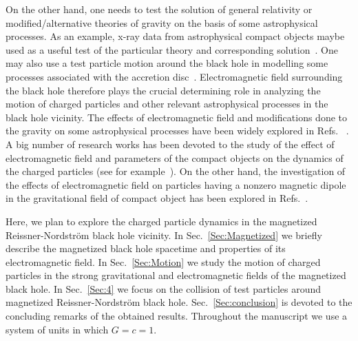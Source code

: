 \documentclass[showpacs,twocolumn,superscriptaddress]{revtex4}
\begin{document}
On the other hand, one needs to test the solution of general relativity or modified/alternative theories of gravity on the basis of some astrophysical processes. As an example, x-ray data from astrophysical compact objects maybe used as a useful test of the particular theory and corresponding solution~\cite{Bambi12a,Bambi16b,Zhou18,Tripathi19}. One may also use a test particle motion around the black hole in modelling some processes associated with the accretion disc~\cite{Bambi17e,Chandrasekhar98}. Electromagnetic field surrounding the black hole therefore plays the crucial determining role in analyzing the motion of charged particles and other relevant astrophysical processes in the black hole vicinity. The effects of electromagnetic field and modifications done to the gravity on some astrophysical processes have been widely explored in Refs.~ \cite{Chen16,Hashimoto17,Dalui19,Han08,Moura00,Morozova14}. A big number of research works has been devoted to the study of the effect of electromagnetic field and parameters of the compact objects on the dynamics of the charged particles (see for example~\cite{Stuchlik20,Jawad16,Hussain15,Jamil15,Hussain17,Babar16,Banados09,Majeed17,Zakria15,Brevik19,
DeLaurentis2018PhRvD,Shaymatov13,Atamurotov13a,Kolos17,Kovar10,
Kovar14,Aliev86,Frolov11,Frolov12,Stuchlik14a,Abdujabbarov11a,
Abdujabbarov11,Abdujabbarov08,Karas12a,Shaymatov15,Duztas-Jamil20,
Turimov18b,Turimov17,Shaymatov20egb,Shaymatov19b,Shaymatov20b,Narzilloev19,Narzilloev:2020b,Narzilloev20c,Narzilloev20a,
Narzilloev20b,Narzilloev21,Shaymatov21b}). On the other hand, the investigation of the effects of electromagnetic field on particles having a nonzero magnetic dipole in the gravitational field of compact object has been explored in Refs.~\cite{deFelice,defelice2004,Toshmatov15d,Abdujabbarov14,Rahimov11a,Rahimov11,
Haydarov20,Rayimbaev20c,Vrba20,Abdujabbarov2020jla,TurimovPhysRevD2020,
BokhariPhysRevD2020,Shaymatov20d}.

Here, we plan to explore the charged particle dynamics in the magnetized Reissner-Nordstr\"om black hole vicinity. In Sec.~\ref{Sec:Magnetized} we briefly describe the magnetized black hole spacetime and properties of its electromagnetic field. In
Sec.~\ref{Sec:Motion} we study the motion of charged particles in the strong gravitational and electromagnetic fields of the magnetized black hole. In Sec.~\ref{Sec:4} we focus on the collision of test particles around magnetized Reissner-Nordstr\"{o}m black hole. Sec.~\ref{Sec:conclusion} is devoted to the concluding remarks of
the obtained results. Throughout the manuscript we use a system of units in which $G=c=1$.
\end{document}
